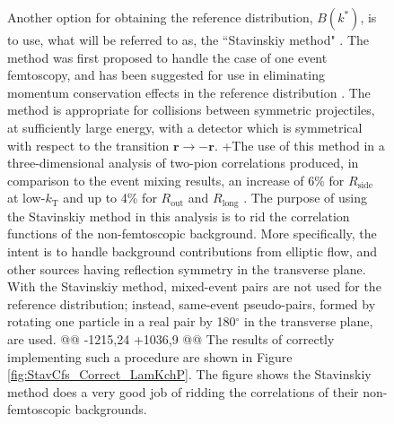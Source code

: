 \begin{figure}[h]
{\begin{table}[htbp]
 Another option for obtaining the reference distribution, $B(k^{*})$, is to use, what will be referred to as, the ``Stavinskiy method" \cite{Stavinskiy04}.
 The method was first proposed to handle the case of one event femtoscopy, and has been suggested for use in eliminating momentum conservation effects in the reference distribution \cite{Lisa:2005dd}.
 The method is appropriate for collisions between symmetric projectiles, at sufficiently large energy, with a detector which is symmetrical with respect to the transition $\mathbf{r} \rightarrow \mathbf{-r}$.
+The use of this method in a three-dimensional analysis of two-pion correlations produced, in comparison to the event mixing results, an increase of 6\% for $R_{\mathrm{side}}$ at low-$k_{\mathrm{T}}$ and up to 4\% for $R_{\mathrm{out}}$ and $R_{\mathrm{long}}$ \cite{Aamodt:2011mr}.
 The purpose of using the Stavinskiy method in this \LamK analysis is to rid the correlation functions of the non-femtoscopic background.  
 More specifically, the intent is to handle background contributions from elliptic flow, and other sources having reflection symmetry in the transverse plane.  
 With the Stavinskiy method, mixed-event pairs are not used for the reference distribution; instead, same-event pseudo-pairs, formed by rotating one particle in a real pair by 180$^\circ$ in the transverse plane, are used.  
@@ -1215,24 +1036,9 @@
 The results of correctly implementing such a procedure are shown in Figure \ref{fig:StavCfs_Correct_LamKchP}.  
 The figure shows the Stavinskiy method does a very good job of ridding the \LamKchP correlations of their non-femtoscopic backgrounds.  
 

\end{table}}
\end{figure}
